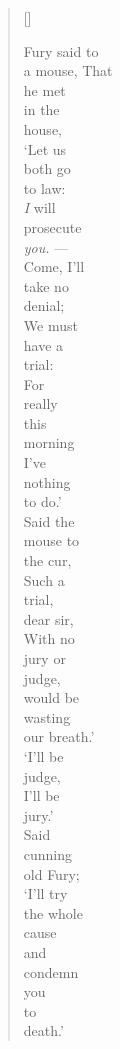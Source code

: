 \documentclass{article}
\begin{document}
\settowidth{\versewidth}{a mouse that morning}
\begin{verse}[\versewidth]
\setlength{\vgap}{1em}
\begin{patverse}
\large Fury said to \\
  a mouse, That \\
  he met \\
  in the \\
  house, \\
\normalsize `Let us \\
  both go \\
  to law: \\
  \emph{I} will \\
  prosecute \\
  \textit{you.} --- \\
  Come, I'll \\
\small take no \\
  denial; \\
  We must \\
  have a \\
  trial: \\
  For \\
\footnotesize really \\
  this \\
  morning \\
  I've \\
  nothing \\
  to do.' \\
  Said the \\
  mouse to \\
\scriptsize the cur, \\
  Such a \\
  trial, \\
  dear sir, \\
  With no \\
  jury or \\
  judge, \\
  would be \\
  wasting \\
  our breath.' \\
\tiny  `I'll be \\
  judge, \\
  I'll be \\
  jury.' \\
  Said \\
  cunning \\
  old Fury; \\
  `I'll try \\
  the whole \\
  cause \\
  and \\
  condemn \\
  you \\
  to \\
  death.'  \par
\end{patverse}
\end{verse}
\end{document}
